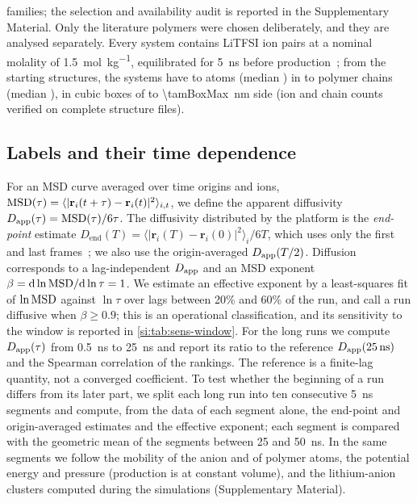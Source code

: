 \documentclass[preprint,12pt]{elsarticle}
\begin{document}
families; the selection and availability audit is reported in the Supplementary Material. Only the \nLongLit{} literature polymers were chosen deliberately, and
they are analysed separately. Every system contains \tamNIons{} LiTFSI ion pairs at a nominal molality of
\SI{1.5}{\mole\per\kilo\gram}, equilibrated for \SI{5}{\nano\second} before
production~\cite{Xie2022Accelerating}; from the starting structures, the systems have
\tamNAtomsMin{} to \tamNAtomsMax{} atoms (median \tamNAtomsMed) in \tamChainsMin{} to
\tamChainsMax{} polymer chains (median \tamChainsMed), in cubic boxes of \tamBoxMin{} to
\SI{\tamBoxMax}{\nano\metre} side (ion and chain counts verified on \tamNRecount{} complete
structure files).

\subsection{Labels and their time dependence}\label{sec:labels}
For an MSD curve averaged over time origins and ions,
$\mathrm{MSD}(\tau)=\langle|\mathbf r_i(t+\tau)-\mathbf r_i(t)|^2\rangle_{i,t}$, we define the apparent
diffusivity $D_{\mathrm{app}}(\tau)=\mathrm{MSD}(\tau)/6\tau$. The diffusivity distributed by the platform is the
\emph{end-point} estimate $D_{\mathrm{end}}(T)=\langle|\mathbf r_i(T)-\mathbf r_i(0)|^2\rangle_i/6T$,
which uses only the first and last frames~\cite{HTPMDcode}; we also use the origin-averaged
$D_{\mathrm{app}}(T/2)$. Diffusion corresponds to a lag-independent $D_{\mathrm{app}}$ and an MSD exponent
$\beta=\mathrm d\ln\mathrm{MSD}/\mathrm d\ln\tau=1$. We estimate an effective exponent by a least-squares
fit of $\ln\mathrm{MSD}$ against $\ln\tau$ over lags between 20\% and 60\% of the run, and call a run
diffusive when $\beta\ge0.9$; this is an operational classification, and its sensitivity to the
window is reported in \cref{si:tab:sens-window}. For the long runs we compute $D_{\mathrm{app}}(\tau)$ from
\SI{0.5}{\nano\second} to \SI{25}{\nano\second} and report its ratio to the reference
$D_{\mathrm{app}}(\SI{25}{\nano\second})$ and the Spearman correlation of the rankings. The reference is a
finite-lag quantity, not a converged coefficient. To test whether the beginning of a run differs
from its later part, we split each long run into ten consecutive \SI{5}{\nano\second} segments
and compute, from the data of each segment alone, the end-point and origin-averaged estimates and
the effective exponent; each segment is compared with the geometric mean of the segments between
25 and \SI{50}{\nano\second}. In the same segments we follow the mobility of the anion and of
polymer atoms, the potential energy and pressure (production is at constant volume), and the
lithium-anion clusters computed during the simulations (Supplementary Material).
\end{document}
